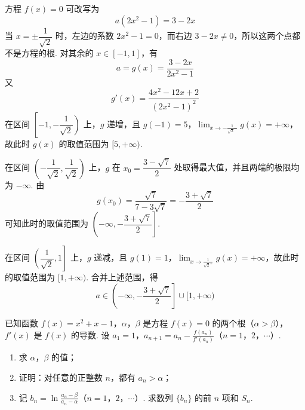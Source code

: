 \begin{solution}
方程 \(f(x)=0\) 可改写为
\[
a(2x^2-1)=3-2x
\]
当 \(x=\pm\dfrac{1}{\sqrt2}\) 时，左边的系数 \(2x^2-1=0\)，而右边 \(3-2x\neq0\)，所以这两个点都不是方程的根. 对其余的 \(x\in[-1,1]\)，有
\[
a=g(x)=\frac{3-2x}{2x^2-1}
\]
又
\[
g'(x)=\frac{4x^2-12x+2}{(2x^2-1)^2}
\]
在区间 \(\left[-1,-\dfrac{1}{\sqrt2}\right)\) 上，\(g\) 递增，且 \(g(-1)=5\)，\(\displaystyle\lim_{x\to-\frac{1}{\sqrt2^-}}g(x)=+\infty\)，故此时 \(g(x)\) 的取值范围为 \([5,+\infty)\).

在区间 \(\left(-\dfrac{1}{\sqrt2},\dfrac{1}{\sqrt2}\right)\) 上，\(g\) 在 \(x_0=\dfrac{3-\sqrt7}{2}\) 处取得最大值，并且两端的极限均为 \(-\infty\). 由
\[
g(x_0)=\frac{\sqrt7}{7-3\sqrt7}=-\frac{3+\sqrt7}{2}
\]
可知此时的取值范围为 \(\left(-\infty,-\dfrac{3+\sqrt7}{2}\right]\).

在区间 \(\left(\dfrac{1}{\sqrt2},1\right]\) 上，\(g\) 递减，且 \(g(1)=1\)，\(\displaystyle\lim_{x\to\frac{1}{\sqrt2^+}}g(x)=+\infty\)，故此时的取值范围为 \([1,+\infty)\). 合并上述范围，得
\[
a\in\left(-\infty,-\frac{3+\sqrt7}{2}\right]\cup[1,+\infty)
\]
\end{solution}

\begin{problem}
已知函数 \( f(x) = x^2 + x - 1 \)，\(\alpha\)，\(\beta\) 是方程 \( f(x) = 0 \) 的两个根（\( \alpha > \beta \)），\( f'(x) \) 是 \( f(x) \) 的导数. 设 \(a_1 = 1\)，\(a_{n+1} = a_n - \frac{f(a_n)}{f'(a_n)}\)（\(n = 1\)，\(2\)，\(\cdots\)）.

\begin{enumerate}
\item 求 \(\alpha\)，\(\beta\) 的值；
\item 证明：对任意的正整数 \(n\)，都有 \(a_{n} > \alpha\)；
\item 记 \( b_{n} = \ln \frac{a_{n} - \beta}{a_{n} - \alpha} \)（\(n = 1\)，\(2\)，\(\cdots\)）. 求数列 \(\{b_{n}\}\) 的前 \( n \) 项和 \( S_{n} \).
\end{enumerate}
\end{problem}

